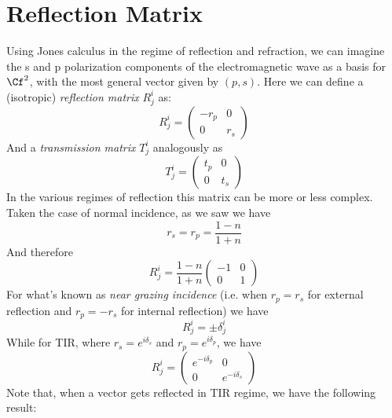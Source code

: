 \documentclass[../electromagnetism.tex]{subfiles}
\begin{document}
\section{Reflection Matrix}
Using Jones calculus in the regime of reflection and refraction, we can imagine the s and p polarization components of the electromagnetic wave as a basis for $\Cf^2$, with the most general vector given by $(p,s)$. Here we can define a (isotropic) \emph{reflection matrix} $R^i_j$ as:
\begin{equation}
	R^i_j=\begin{pmatrix}
		-r_p&0\\
		0&r_s
	\end{pmatrix}
	\label{eq:reflectionmatrix}
\end{equation}
And a \emph{transmission matrix} $T^i_j$ analogously as
\begin{equation}
	T^i_j=\begin{pmatrix}
		t_p&0\\
		0&t_s
	\end{pmatrix}
	\label{eq:transmissionmatrix}
\end{equation}
In the various regimes of reflection this matrix can be more or less complex.\\
Taken the case of normal incidence, as we saw we have
\begin{equation*}
	r_s=r_p=\frac{1-n}{1+n}
\end{equation*}
And therefore
\begin{equation}
	R^i_j=\frac{1-n}{1+n}\begin{pmatrix}
		-1&0\\
		0&1
	\end{pmatrix}
	\label{eq:normalincidencereflection}
\end{equation}
For what's known as \emph{near grazing incidence} (i.e. when $r_p=r_s$ for external reflection and $r_p=-r_s$ for internal reflection) we have
\begin{equation}
	R^i_j=\pm\delta^i_j
	\label{eq:neargrazingincidencematrix}
\end{equation}
While for TIR, where $r_s=e^{i\delta_s}$ and $r_p=e^{i\delta_p}$, we have
\begin{equation*}
	R^i_j=\begin{pmatrix}
		e^{-i\delta_p}&0\\
		0&e^{-i\delta_s}
	\end{pmatrix}
\end{equation*}
Note that, when a vector gets reflected in TIR regime, we have the following result:
\end{document}
